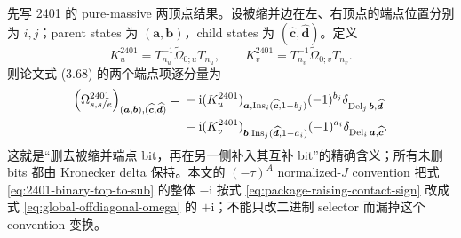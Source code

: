 \documentclass[11pt,a4paper]{ctexart}
\newcommand{\ii}{\mathrm i}
\begin{document}
先写 2401 的 pure-massive 两顶点结果。设被缩并边在左、右顶点的端点位置分别为 $i,j$；parent states 为 $(\bm a,\bm b)$，child states 为 $(\widehat{\bm c},\widehat{\bm d})$。定义
\begin{equation}
 K_u^{2401}=T_{n_u}^{-1}\widetilde\Omega_{0;u}T_{n_u},
 \qquad
 K_v^{2401}=T_{n_v}^{-1}\widetilde\Omega_{0;v}T_{n_v}.
 \label{eq:component-log-kernel}
\end{equation}
则论文式 (3.68) 的两个端点项逐分量为
\begin{align}
 \left(\Omega_{s,s/e}^{2401}\right)_{(\bm a,\bm b),(\widehat{\bm c},\widehat{\bm d})}
={}&-\ii
 (K_u^{2401})_{\bm a,\operatorname{Ins}_i(\widehat{\bm c},1-b_j)}
 (-1)^{b_j}
 \delta_{\operatorname{Del}_j\bm b,\widehat{\bm d}}
 \notag\\
 &-\ii
 (K_v^{2401})_{\bm b,\operatorname{Ins}_j(\widehat{\bm d},1-a_i)}
 (-1)^{a_i}
 \delta_{\operatorname{Del}_i\bm a,\widehat{\bm c}}.
 \label{eq:2401-binary-top-to-sub}
\end{align}
这就是“删去被缩并端点 bit，再在另一侧补入其互补 bit”的精确含义；所有未删 bits 都由 Kronecker delta 保持。本文的 $(-\tau)^A$ normalized-$J$ convention 把式 \eqref{eq:2401-binary-top-to-sub} 的整体 $-\ii$ 按式 \eqref{eq:package-raising-contact-sign} 改成式 \eqref{eq:global-offdiagonal-omega} 的 $+\ii$；不能只改二进制 selector 而漏掉这个 convention 变换。
\end{document}
